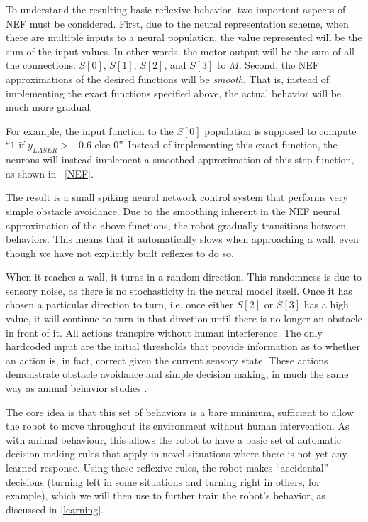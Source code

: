 \documentclass{frontiersSCNS}
\begin{document}
To understand the resulting basic reflexive behavior,
two important aspects of NEF must be considered. First, due to the neural 
representation scheme, when there are multiple inputs to a neural population, 
the value represented will be the sum of the input values. In other words. the 
motor output will be the sum of all the connections: $S[0]$, $S[1]$, $S[2]$, and $S[3]$ to $M$. 
Second, the NEF approximations of the desired functions will be \textit{smooth}. 
That is, instead of implementing the exact functions specified above, the 
actual behavior will be much more gradual. 

For example, the input function to 
the $S[0]$ population is supposed to compute ``$1$ if $y_{LASER} > -0.6$ else $0$''. 
Instead of implementing this exact function, the neurons will instead implement
a smoothed approximation of this step function, as shown in
\figurename~\ref{NEF}.

The result is a small spiking neural network control system that performs very 
simple obstacle avoidance. Due to the smoothing inherent in the NEF neural 
approximation of the above functions, the robot gradually transitions between 
behaviors. This means that it automatically slows when approaching a wall, 
even though we have not explicitly built reflexes to do so.  

When it reaches a wall, it turns in a random direction. This randomness is due 
to sensory noise, as there is no stochasticity in the neural model 
itself. Once it has chosen a particular direction to turn, i.e. once 
either $S[2]$ or $S[3]$ has a high value, it will continue to turn in that 
direction until there is no longer an obstacle in front of it. All actions 
transpire without human interference. The only hardcoded input are the initial 
thresholds that provide information as to whether an action is, in fact, 
correct given the current sensory state. These actions demonstrate obstacle 
avoidance and simple decision making, in much the same way as animal behavior 
studies \citep{kim2007encoding}. 

The core idea is that this set of behaviors is a bare minimum, sufficient to
allow the robot to move throughout its environment without human intervention.
As with animal behaviour, this allows the robot to have a basic set of automatic
decision-making rules that apply in novel situations where there is not yet
any learned response.  Using these reflexive rules, the robot makes ``accidental''
decisions (turning left in some situations and turning right in others, for
example), which we will then use to further train the robot's behavior, as
discussed in \ref{learning}.
\end{document}

